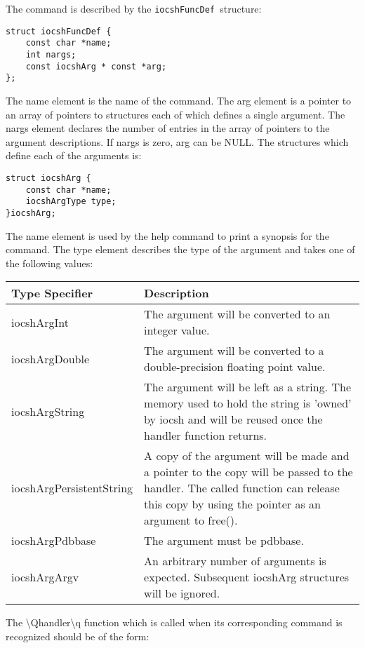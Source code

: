 The command is described by the  \verb|iocshFuncDef |structure:

\begin{verbatim}struct iocshFuncDef {
    const char *name;
    int nargs;
    const iocshArg * const *arg;
};
\end{verbatim}The name element is the name of the command.  The arg element is a pointer to an array of pointers to structures each of 
which defines a single argument.  The nargs element declares the number of entries in the array of pointers to the 
argument descriptions.  If nargs is zero, arg can be NULL.  The structures which define each of the arguments is:

\begin{verbatim}struct iocshArg {
    const char *name;
    iocshArgType type;
}iocshArg;
\end{verbatim}The name element is used by the help command to print a synopsis for the command.  The type element describes the type 
of the argument and takes one of the following values:
\begin{center}\begin{longtable}{p{1.5in}p{3.76in}}
Type Specifier & Description\\
\hline
iocshArgInt & The argument will be converted to an integer value.\\
iocshArgDouble & The argument will be converted to a double-precision floating point value.\\
iocshArgString & The argument will be left as a string.  The memory used to hold the string is 'owned' by iocsh and will be reused once the handler function returns.\\
iocshArgPersistentString & A copy of the argument will be made and a pointer to the copy will be passed to the handler.  The called function can release this copy by using the pointer as an argument to free().\\
iocshArgPdbbase & The argument must be pdbbase.\\
iocshArgArgv & An arbitrary number of arguments is expected.  Subsequent iocshArg structures will be ignored.
\end{longtable}\end{center}


The \textbackslash{}Qhandler\textbackslash{}q function which is called when its corresponding command is recognized should be of the form:

